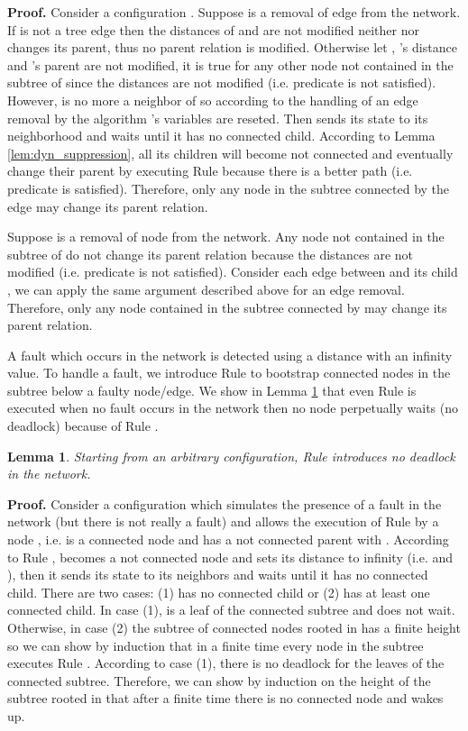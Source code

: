 \documentclass[11pt]{article}
\newtheorem{lemma}{Lemma}
\newenvironment{proof}{\noindent \begin{rm}{\textbf{Proof.} }}{\hspace*{\fill}\par\end{rm} \vspace{.3cm}}
\newcommand{\ARA}{}
\newcommand{\CRG}{}
\begin{document}
\begin{proof}
Consider a configuration . Suppose  is a removal of edge  from the network. If  is not a tree edge then the distances of  and  are not modified neither  nor  changes its parent, thus no parent relation is modified. Otherwise let , 's distance and 's parent are not modified, it is true for any other node not contained in the subtree of  since the distances are not modified (i.e. predicate  is not satisfied). However,  is no more a neighbor of  so according to the handling of an edge removal by the algorithm 's variables are reseted. Then  sends its state to its neighborhood and waits until it has no connected child. According to Lemma \ref{lem:dyn_suppression}, all its children will become not connected and eventually change their parent by executing Rule \ARA\/ because there is a better path (i.e. predicate  is satisfied). Therefore, only any node in the subtree connected by the edge  may change its parent relation.

Suppose  is a removal of node  from the network. Any node not contained in the subtree of  do not change its parent relation because the distances are not modified (i.e. predicate  is not satisfied). Consider each edge  between  and its child , we can apply the same argument described above for an edge removal. Therefore, only any node contained in the subtree connected by  may change its parent relation.
\end{proof}

A fault which occurs in the network is detected using a distance with an infinity value. To handle a fault, we introduce Rule \CRG\/ to bootstrap connected nodes in the subtree below a faulty node/edge. We show in Lemma \ref{lem:no_deadlock} that even Rule \CRG\/ is executed when no fault occurs in the network then no node perpetually waits (no deadlock) because of Rule \CRG.

\begin{lemma}
Starting from an arbitrary configuration, Rule \CRG\/ introduces no deadlock in the network.
\label{lem:no_deadlock}
\end{lemma}

\begin{proof}
Consider a configuration which simulates the presence of a fault in the network (but there is not really a fault) and allows the execution of Rule \CRG\/ by a node , i.e.  is a connected node and has a not connected parent  with . According to Rule \CRG,  becomes a not connected node and sets its distance to infinity (i.e.  and ), then it sends its state to its neighbors and waits until it has no connected child. There are two cases: (1)  has no connected child or (2)  has at least one connected child. In case (1),  is a leaf of the connected subtree and does not wait. Otherwise, in case (2) the subtree of connected nodes rooted in  has a finite height so we can show by induction that in a finite time every node in the subtree executes Rule \CRG\/. According to case (1), there is no deadlock for the leaves of the connected subtree. Therefore, we can show by induction on the height of the subtree rooted in  that after a finite time there is no connected node and  wakes up.
\end{proof}
\end{document}
